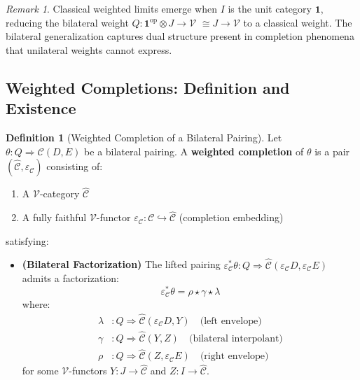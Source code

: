 \documentclass[11pt]{article}
\theoremstyle{plain}
\theoremstyle{definition}
\newtheorem{definition}[theorem]{Definition}
\theoremstyle{remark}
\newtheorem{remark}[theorem]{Remark}
\newcommand{\V}{\mathcal{V}}
\newcommand{\op}{\mathrm{op}}
\begin{document}
\begin{remark}
Classical weighted limits emerge when $I$ is the unit category $\mathbf{1}$, reducing the bilateral weight $Q : \mathbf{1}^{\op} \otimes J \to \V$ $\cong J \to \V$ to a classical weight. The bilateral generalization captures dual structure present in completion phenomena that unilateral weights cannot express.
\end{remark}

\subsection{Weighted Completions: Definition and Existence}

\begin{definition}[Weighted Completion of a Bilateral Pairing]\label{def:weighted-completion}
Let $\theta : Q \Rightarrow \mathcal{C}(D,E)$ be a bilateral pairing. A \textbf{weighted completion} of $\theta$ is a pair $(\widehat{\mathcal{C}}, \varepsilon_{\mathcal{C}})$ consisting of:
\begin{enumerate}
\item A $\V$-category $\widehat{\mathcal{C}}$
\item A fully faithful $\V$-functor $\varepsilon_{\mathcal{C}} : \mathcal{C} \hookrightarrow \widehat{\mathcal{C}}$ (completion embedding)
\end{enumerate}
satisfying:

\begin{itemize}
\item \textbf{(Bilateral Factorization)} The lifted pairing $\varepsilon_{\mathcal{C}}^* \theta : Q \Rightarrow \widehat{\mathcal{C}}(\varepsilon_{\mathcal{C}} D, \varepsilon_{\mathcal{C}} E)$ admits a factorization:
$$\varepsilon_{\mathcal{C}}^* \theta = \rho \star \gamma \star \lambda$$
where:
\begin{align}
\lambda &: Q \Rightarrow \widehat{\mathcal{C}}(\varepsilon_{\mathcal{C}} D, Y) \quad \text{(left envelope)} \\
\gamma &: Q \Rightarrow \widehat{\mathcal{C}}(Y, Z) \quad \text{(bilateral interpolant)} \\
\rho &: Q \Rightarrow \widehat{\mathcal{C}}(Z, \varepsilon_{\mathcal{C}} E) \quad \text{(right envelope)}
\end{align}
for some $\V$-functors $Y : J \to \widehat{\mathcal{C}}$ and $Z : I \to \widehat{\mathcal{C}}$.


\end{itemize}
\end{definition}
\end{document}
